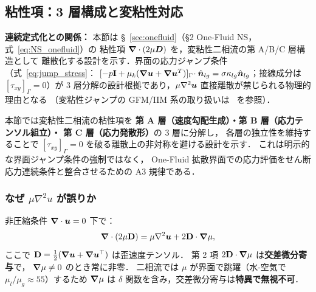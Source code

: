 %
%
\subsection{粘性項：3 層構成と変粘性対応}
\label{sec:viscous_3layer}

\noindent\textbf{連続定式化との関係：}
本節は §~\ref{sec:onefluid}（§2 One-Fluid NS，式~\eqref{eq:NS_onefluid}）の
粘性項 $\bm{\nabla}\cdot(2\mu\bm{D})$ を，変粘性二相流の第 A/B/C 層構造として
離散化する設計を示す．界面の応力ジャンプ条件（式~\eqref{eq:jump_stress}：
$[-p\mathbf{I}+\mu_k(\bm{\nabla}\bm{u}+\bm{\nabla}\bm{u}^T)]_\Gamma\!\cdot\hat{\bm n}_{lg} = \sigma\kappa_{lg}\hat{\bm n}_{lg}$；接線成分は $[\tau_{xy}]_\Gamma=0$）が
3 層分解の設計根拠であり，$\mu\nabla^2\bm{u}$ 直接離散が禁じられる物理的理由となる
（変粘性ジャンプの GFM/IIM 系の取り扱いは~\cite{Kang2000,Sussman2000} を参照）．

本節では変粘性二相流の粘性項を
\textbf{第 A 層（速度勾配生成）・第 B 層（応力テンソル組立）・
第 C 層（応力発散形）}の 3 層に分解し，
各層の独立性を維持することで
$[\tau_{xy}]_\Gamma=0$ を破る離散上の非対称を避ける設計を示す．
これは明示的な界面ジャンプ条件の強制ではなく，
One-Fluid 拡散界面での応力評価をせん断応力連続条件と整合させるための
A3 規律である．

\subsubsection{\texorpdfstring{なぜ $\mu\nabla^2 u$ が誤りか}{なぜ μ∇²u が誤りか}}
\label{sec:viscous_mu_lap_forbidden}

非圧縮条件 $\bm{\nabla}\cdot\bm{u}=0$ 下で：
\begin{equation}
  \bm{\nabla}\cdot(2\mu\mathbf{D})
  = \mu\nabla^2\bm{u} + 2\mathbf{D}\cdot\bm{\nabla}\mu,
  \label{eq:viscous_exact_decomposition}
\end{equation}
ここで $\mathbf{D} = \tfrac{1}{2}(\bm{\nabla}\bm{u} + \bm{\nabla}\bm{u}^\top)$
は歪速度テンソル．
第 2 項 $2\mathbf{D}\cdot\bm{\nabla}\mu$ は\textbf{交差微分寄与}で，
$\bm{\nabla}\mu\neq 0$ のとき常に非零．
二相流では $\mu$ が界面で跳躍（水-空気で $\mu_l/\mu_g\approx 55$）するため
$\bm{\nabla}\mu$ は $\delta$ 関数を含み，交差微分寄与は\textbf{特異で無視不可}．

